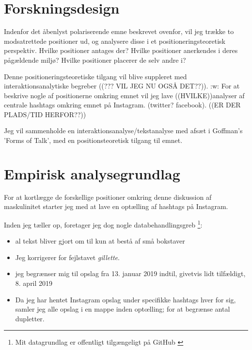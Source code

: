 \section{Forskningsdesign} 

Indenfor det åbenlyst polariserende emne beskrevet ovenfor, vil
jeg trække to modsatrettede positioner ud, og analysere disse i et
positioneringsteoretisk perspektiv. Hvilke positioner antages
der? Hvilke positioner anerkendes i deres pågældende miljø? Hvilke
positioner placerer de selv andre i?

Denne positioneringsteoretiske tilgang vil blive suppleret med
interaktionsanalytiske begreber ((??? VIL JEG NU OGSÅ DET??)).
:w: For at beskrive nogle af positionerne omkring emnet vil jeg
lave ((HVILKE))analyser af centrale hashtags omkring emnet på
Instagram.   (twitter?  facebook). ((ER DER PLADS/TID HERFOR??))


Jeg vil sammenholde en interaktionsanalyse/tekstanalyse med afsæt
i Goffman's 'Forms of Talk', med en positionsteoretisk tilgang til
emnet. 


\section{Empirisk analysegrundlag}

For at kortlægge de forskellige positioner omkring denne 
diskussion af maskulinitet starter jeg med at lave en optælling af 
hashtags på Instagram.

Inden jeg tæller op, foretager jeg dog nogle databehandlingsgreb 
\footnote{Mit datagrundlag er offentligt tilgængeligt på GitHub 
\autocite{andersenEksamensopgaveSocialiseringOg2019}}:
\begin{itemize}
    \item
        al tekst bliver gjort om til kun at bestå af små bokstaver
    \item
        Jeg korrigerer for fejlstavet \textit{gillette}.
    \item
        jeg begrænser mig til opslag fra 13. januar 2019 indtil, 
        givetvis lidt tilfældigt, 8. april 2019
    \item
        Da jeg har hentet Instagram opslag under specifikke 
        hashtags hver for sig, samler jeg alle opslag i en mappe 
        inden optœlling; for at begrænse antal dupletter.
\end{itemize}

